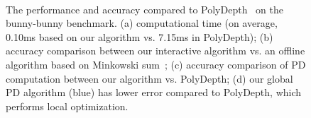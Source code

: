 \begin{figure}[!htb]
  \centering
  \\
  \caption[The performance and accuracy compared to PolyDepth on bunny-bunny benchmark]{The performance and accuracy compared to PolyDepth~\protect\cite{Je:2012:PRP} on the bunny-bunny benchmark. (a) computational time (on average, 0.10ms based on our algorithm vs. 7.15ms in PolyDepth); (b) accuracy comparison between our interactive algorithm vs. an offline algorithm based on Minkowski sum~\protect\cite{Lien:2009:ASM}; (c) accuracy comparison of PD computation between our algorithm vs. PolyDepth; (d) our global PD algorithm (blue) has lower error compared to PolyDepth, which performs local optimization. }\label{fig:2:bunnymodels}
\end{figure}

